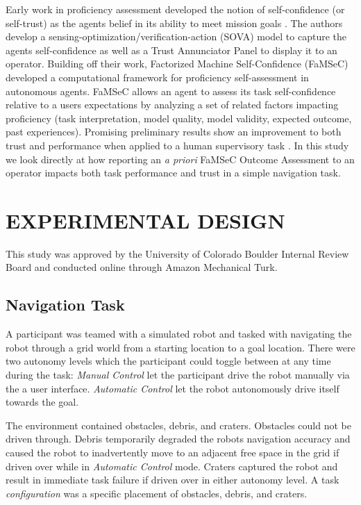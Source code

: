 \documentclass[aaai]{article}
\begin{document}
Early work in proficiency assessment developed the notion of self-confidence (or self-trust) as the agents belief in its ability to meet mission goals \cite{Hutchins2015}. The authors develop a sensing-optimization/verification-action (SOVA) model to capture the agents self-confidence as well as a Trust Annunciator Panel to display it to an operator. Building off their work, Factorized Machine Self-Confidence (FaMSeC) \cite{israelsen2019ConfPaper,aitken2016Thesis} developed a computational framework for proficiency self-assessment in autonomous agents. FaMSeC allows an agent to assess its task self-confidence relative to a users expectations by analyzing a set of related factors impacting proficiency (task interpretation, model quality, model validity, expected outcome, past experiences). Promising preliminary results show an improvement to both trust and performance when applied to a human supervisory task  \cite{israelsenThesis}. In this study we look directly at how reporting an \textit{a priori} FaMSeC Outcome Assessment to an operator impacts both task performance and trust in a simple navigation task.

\section{EXPERIMENTAL DESIGN}\label{METHODS}
This study was approved by the University of Colorado Boulder Internal Review Board and conducted online through Amazon Mechanical Turk.

\subsection{Navigation Task}
A participant was teamed with a simulated robot and tasked with navigating the robot through a grid world from a starting location to a goal location. There were two autonomy levels which the participant could toggle between at any time during the task: \textit{Manual Control} let the participant drive the robot manually via the a user interface. \textit{Automatic Control} let the robot autonomously drive itself towards the goal.

The environment contained obstacles, debris, and craters. Obstacles could not be driven through. Debris temporarily degraded the robots navigation accuracy and caused the robot to inadvertently move to an adjacent free space in the grid if driven over while in \emph{Automatic Control} mode. Craters captured the robot and result in immediate task failure if driven over in either autonomy level. A task \textit{configuration} was a specific placement of obstacles, debris, and craters.
\end{document}
